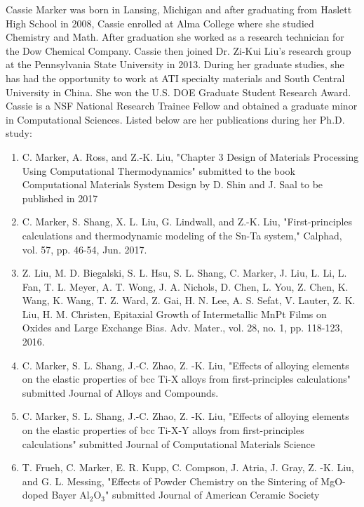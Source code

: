 
Cassie Marker was born in Lansing, Michigan and after graduating from Haslett High School in 2008, Cassie enrolled at Alma College where she studied Chemistry and Math. After graduation she worked as a research technician for the Dow Chemical Company. Cassie then joined Dr. Zi-Kui Liu's research group at the Pennsylvania State University in 2013. During her graduate studies, she has had the opportunity to work at ATI specialty materials and South Central University in China. She won the U.S. DOE Graduate Student Research Award. Cassie is a NSF National Research Trainee Fellow and obtained a graduate minor in Computational Sciences. 
\newline
\newline
\noindent Listed below are her publications during her Ph.D. study:
\begin{enumerate}
	\item C. Marker, A. Ross, and Z.-K. Liu, "Chapter 3 Design of Materials Processing Using Computational Thermodynamics" submitted to the book Computational Materials System Design by D. Shin and J. Saal to be published in 2017
	\item C. Marker, S. Shang, X. L. Liu, G. Lindwall, and Z.-K. Liu, "First-principles calculations and thermodynamic modeling of the Sn-Ta system," Calphad, vol. 57, pp. 46-54, Jun. 2017.
	\item Z. Liu, M. D. Biegalski, S. L. Hsu, S. L. Shang, C. Marker, J. Liu, L. Li, L. Fan, T. L. Meyer, A. T. Wong, J. A. Nichols, D. Chen, L. You, Z. Chen, K. Wang, K. Wang, T. Z. Ward, Z. Gai, H. N. Lee, A. S. Sefat, V. Lauter, Z. K. Liu, H. M. Christen, Epitaxial Growth of Intermetallic MnPt Films on Oxides and Large Exchange Bias. Adv. Mater., vol. 28, no. 1, pp. 118-123, 2016.
	\item C. Marker, S. L. Shang, J.-C. Zhao, Z. -K. Liu, "Effects of alloying elements on the elastic properties of bcc Ti-X alloys from first-principles calculations" submitted Journal of Alloys and Compounds.
	\item C. Marker, S. L. Shang, J.-C. Zhao, Z. -K. Liu, "Effects of alloying elements on the elastic properties of bcc Ti-X-Y alloys from first-principles calculations" submitted Journal of Computational Materials Science
	\item T. Frueh, C. Marker, E. R. Kupp, C. Compson, J. Atria, J. Gray, Z. -K. Liu, and G. L. Messing, "Effects of Powder Chemistry on the Sintering of MgO-doped Bayer Al$_{2}$O$_{3}$" submitted Journal of American Ceramic Society
\end{enumerate}

